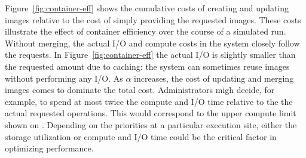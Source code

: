 \documentclass[sigconf]{acmart}
\begin{document}
Figure~\ref{fig:container-eff} shows the cumulative costs of creating and updating images relative to the cost of simply providing the requested images.
These costs illustrate the effect of container efficiency over the course of a simulated run.
Without merging, the actual I/O and compute costs in the system closely follow the requests.
In Figure~\ref{fig:container-eff} the actual I/O is slightly smaller than the requested amount due to caching:
the system can sometimes reuse images without performing any I/O.
As $\alpha$ increases, the cost of updating and merging images comes to dominate the total cost.
Administrators migh decide, for example,
to spend at most twice the compute and I/O time relative to the the actual requested operations.
This would correspond to the upper compute limit shown on .
Depending on the priorities at a particular execution site,
either the storage utilization or compute and I/O time could be the critical factor in optimizing performance.
\end{document}
